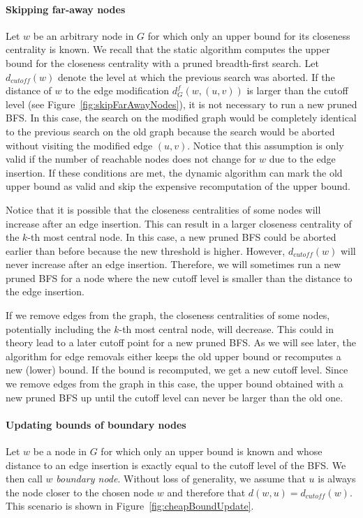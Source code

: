 \paragraph{Skipping far-away nodes}
Let $w$ be an arbitrary node in $G$ for which only an upper bound for its closeness centrality is known. We recall that the static algorithm computes the upper bound for the closeness centrality with a pruned breadth-first search. Let $d_{cutoff}(w)$ denote the level at which the previous search was aborted. If the distance of $w$ to the edge modification $d_G^f(w, (u, v))$ is larger than the cutoff level (see Figure~\ref{fig:skipFarAwayNodes}), it is not necessary to run a new pruned BFS. In this case, the search on the modified graph would be completely identical to the previous search on the old graph because the search would be aborted without visiting the modified edge $(u, v)$. Notice that this assumption is only valid if the number of reachable nodes does not change for $w$ due to the edge insertion. If these conditions are met, the dynamic algorithm can mark the old upper bound as valid and skip the expensive recomputation of the upper bound.

Notice that it is possible that the closeness centralities of some nodes will increase after an edge insertion. This can result in a larger closeness centrality of the $k$-th most central node. In this case, a new pruned BFS could be aborted earlier than before because the new threshold is higher. However, $d_{cutoff}(w)$ will never increase after an edge insertion. Therefore, we will sometimes run a new pruned BFS for a node where the new cutoff level is smaller than the distance to the edge insertion.

If we remove edges from the graph, the closeness centralities of some nodes, potentially including the $k$-th most central node, will decrease. This could in theory lead to a later cutoff point for a new pruned BFS. As we will see later, the algorithm for edge removals either keeps the old upper bound or recomputes a new (lower) bound. If the bound is recomputed, we get a new cutoff level. Since we remove edges from the graph in this case, the upper bound obtained with a new pruned BFS up until the cutoff level can never be larger than the old one.

\paragraph{Updating bounds of boundary nodes}
Let $w$ be a node in $G$ for which only an upper bound is known and whose distance to an edge insertion is exactly equal to the cutoff level of the BFS. We then call $w$ \emph{boundary node}. Without loss of generality, we assume that $u$ is always the node closer to the chosen node $w$ and therefore that $d(w, u) = d_{cutoff}(w)$. This scenario is shown in Figure~\ref{fig:cheapBoundUpdate}.

